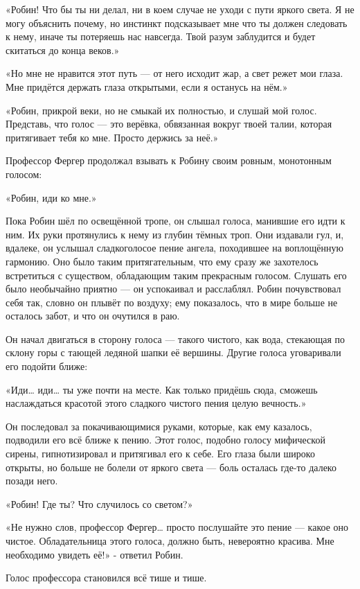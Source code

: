 \documentclass[a5paper, 9pt,
final, openany, twoside=true]{memoir}
\begin{document}
«Робин! Что бы ты ни делал, ни в коем случае не уходи с пути яркого света. Я не могу объяснить почему, но инстинкт подсказывает мне что ты должен следовать к нему, иначе ты потеряешь нас навсегда. Твой разум заблудится и будет скитаться до конца веков.»

«Но мне не нравится этот путь — от него исходит жар, а свет режет мои глаза. Мне придётся держать глаза открытыми, если я останусь на нём.»

«Робин, прикрой веки, но не смыкай их полностью, и слушай мой голос. Представь, что голос — это верёвка, обвязанная вокруг твоей талии, которая притягивает тебя ко мне. Просто держись за неё.»

Профессор Фергер продолжал взывать к Робину своим ровным, монотонным голосом:

«Робин, иди ко мне.»

Пока Робин шёл по освещённой тропе, он слышал голоса, манившие его идти к ним. Их руки протянулись к нему из глубин тёмных троп. Они издавали гул, и, вдалеке, он услышал сладкоголосое пение ангела, походившее на воплощённую гармонию. Оно было таким притягательным, что ему сразу же захотелось встретиться с существом, обладающим таким прекрасным голосом. Слушать его было необычайно приятно — он успокаивал и расслаблял. Робин почувствовал себя так, словно он плывёт по воздуху; ему показалось, что в мире больше не осталось забот, и что он очутился в раю.

Он начал двигаться в сторону голоса — такого чистого, как вода, стекающая по склону горы с тающей ледяной шапки её вершины. Другие голоса уговаривали его подойти ближе:

«Иди… иди… ты уже почти на месте. Как только придёшь сюда, сможешь наслаждаться красотой этого сладкого чистого пения целую вечность.»

Он последовал за покачивающимися руками, которые, как ему казалось, подводили его всё ближе к пению. Этот голос, подобно голосу мифической сирены, гипнотизировал и притягивал его к себе. Его глаза были широко открыты, но больше не болели от яркого света — боль осталась где-то далеко позади него.

«Робин! Где ты? Что случилось со светом?»

«Не нужно слов, профессор Фергер… просто послушайте это пение — какое оно чистое. Обладательница этого голоса, должно быть, невероятно красива. Мне необходимо увидеть её!» - ответил Робин.

Голос профессора становился всё тише и тише.
\end{document}
